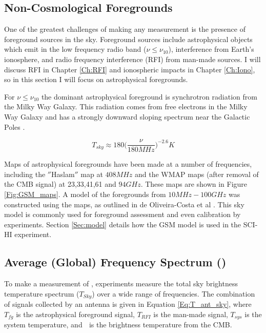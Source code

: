 \subsection{Non-Cosmological Foregrounds} \label{Sec:gsm_fore}

One of the greatest challenges of making any \cm measurement is the presence of foreground sources in the sky. Foreground sources include astrophysical objects which emit in the low frequency radio band ($\nu \leq \nu_{10}$), interference from Earth's ionosphere, and radio frequency interference (RFI) from man-made sources. I will discuss RFI in Chapter \ref{Ch:RFI} and ionospheric impacts in Chapter \ref{Ch:Iono}, so in this section I will focus on astrophysical foregrounds. 

For $\nu \leq \nu_{10}$ the dominant astrophysical foreground is synchrotron radiation from the Milky Way Galaxy. This radiation comes from free electrons in the Milky Way Galaxy and has a strongly downward sloping spectrum near the Galactic Poles \cite{furlanetto_2006}. 

\begin{equation}\label{Eq:T_sky_approx}
T_{sky} \approx 180 \Big( \frac{\nu}{180 MHz} \Big)^{-2.6} K
\end{equation}

Maps of astrophysical foregrounds have been made at a number of frequencies, including the $''$Haslam$''$ map at $408 MHz$ and the WMAP maps (after removal of the CMB signal) at 23,33,41,61 and $94 GHz$. These maps are shown in Figure \ref{Fig:GSM_maps}. A model of the foregrounds from $10 MHz-100 GHz$ was constructed using the maps, as outlined in de Oliveira-Costa et al \cite{GSM_model}. This sky model is commonly used for foreground assessment and even calibration by \cm experiments. Section \ref{Sec:model} details how the GSM model is used in the SCI-HI experiment.


\subsection{Average (Global) Frequency Spectrum (\avgdtb)} \label{Sec:avgdtb}

To make a measurement of \avgdtb, experiments measure the total sky brightness temperature spectrum ($T_{Sky}$) over a wide range of frequencies. The combination of signals collected by an antenna is given in Equation \ref{Eq:T_ant_sky}, where $T_{fg}$ is the astrophysical foreground signal, $T_{RFI}$ is the man-made signal, $T_{sys}$ is the system temperature, and \tb $\;$ is the brightness temperature from the CMB. 

